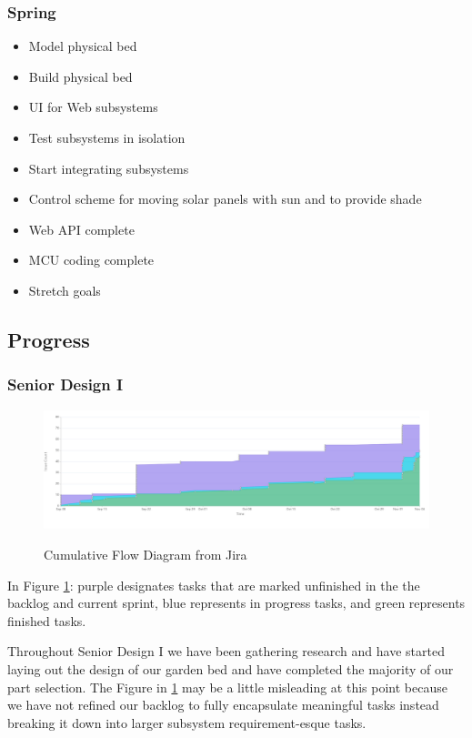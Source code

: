 \subsubsection{Spring}
\begin{itemize}
    \item Model physical bed
    \item Build physical bed
    \item UI for Web subsystems
    \item Test subsystems in isolation
    \item Start integrating subsystems
    \item Control scheme for moving solar panels with sun and to provide shade
    \item Web API complete
    \item MCU coding complete
    \item Stretch goals
\end{itemize}

\subsection{Progress}

\subsubsection{Senior Design I}
\begin{figure}[H]
    \caption{Cumulative Flow Diagram from Jira}
    \centering
    \includegraphics[width=\textwidth]{images/Cumulative flow diagram.png}
    \label{fig:cumulativeflow}
\end{figure}
In Figure \ref{fig:cumulativeflow}: purple designates tasks that are marked unfinished in the the backlog and current sprint, blue represents in progress tasks, and green represents finished tasks.

Throughout Senior Design I we have been gathering research and have started laying out the design of our garden bed and have completed the majority of our part selection. The Figure in \ref{fig:cumulativeflow} may be a little misleading at this point because we have not refined our backlog to fully encapsulate meaningful tasks instead breaking it down into larger subsystem requirement-esque tasks.

